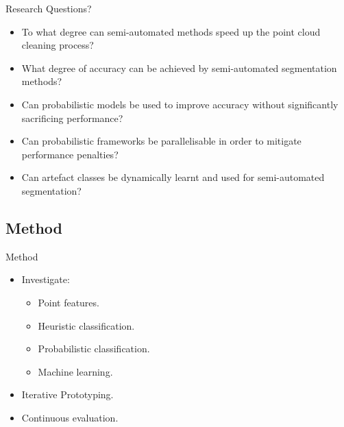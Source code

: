 \documentclass{beamer}
\begin{document}
\begin{frame}{Research Questions?}

\begin{itemize}
\item To what degree can semi-automated methods speed up the point cloud cleaning process?
\item What degree of accuracy can be achieved by semi-automated segmentation methods?
\item Can probabilistic models be used to improve accuracy without significantly sacrificing performance?
\item Can probabilistic frameworks be parallelisable in order to mitigate performance penalties?  
\item Can artefact classes be dynamically learnt and used for semi-automated segmentation?
\end{itemize}

\end{frame}

\subsection{Method}

\begin{frame}{Method}

\begin{itemize}
\item Investigate:
\begin{itemize}
  \item Point features.
  \item Heuristic classification.
  \item Probabilistic classification.
  \item Machine learning.
\end{itemize}
\item Iterative Prototyping.
\item Continuous evaluation.
\end{itemize}

\end{frame}
\end{document}
